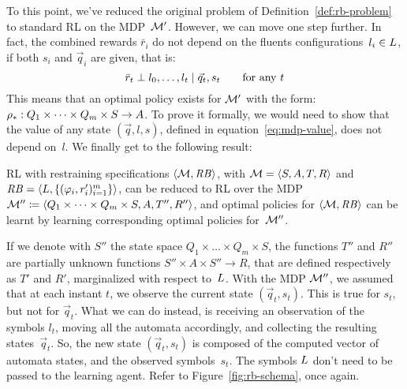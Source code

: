 To this point, we've reduced the original problem of
Definition~\ref{def:rb-problem} to standard RL on the MDP~$\mathcal{M}'$. However,
we can move one step further. In fact, the combined rewards $\bar{r}_i$ do not
depend on the fluents configurations~$l_i \in L$, if both $s_i$
and $\vec{q}_i$ are given, that is:
\[
	\bar{r}_t \perp l_0, \dots, l_t \mid \vec{q}_t, s_t \qquad
	\text{for any $t$}
\]
This means that an optimal policy exists for $\mathcal{M}'$ with the form:
${\rho}_*: Q_1 \times \dots \times Q_m \times S \to A$.
To prove it formally, we would need to show that the value of any state
$(\vec{q}, l, s)$, defined in equation~\eqref{eq:mdp-value}, does not depend
on~$l$. We finally get to the following result:
\begin{theorem}
	\cite{bib:bolt} RL with \ldl{} restraining specifications
	$\langle \mathcal{M}, \text{\textit{RB}} \rangle$, with $\mathcal{M} = \langle S, A, T,
	R \rangle$ and $\text{\textit{RB}} = \langle L, \{(\varphi_i,
	r_i')_{i=1}^m\} \rangle$, can be reduced to RL over the MDP $\mathcal{M}'' \coloneqq
	\langle Q_1 \times \dots \times Q_m \times S, A, T'', R''\rangle$,
	and optimal policies for $\langle \mathcal{M}, \text{\textit{RB}} \rangle$ can be learnt
	by learning corresponding optimal policies for~$\mathcal{M}''$.
	\label{th:bolt-equivalence}
\end{theorem}
If we denote with $S''$ the state space $Q_1 \times \dots \times Q_m \times
S$, the functions $T''$ and $R''$ are partially unknown functions $S'' \times
A \times S'' \to R$, that are defined respectively as $T'$ and $R'$,
marginalized with respect to~$L$. With the MDP $\mathcal{M}''$, we assumed
that at each instant $t$, we observe the current state $(\vec{q}_t, s_t)$.
This is true for $s_t$, but not for $\vec{q}_t$. What we can do instead, is
receiving an observation of the symbols $l_t$, moving all the automata
accordingly, and collecting the resulting states~$\vec{q}_t$. So, the new
state $(\vec{q}_t, s_t)$ is composed of the computed vector of automata
states, and the observed symbols~$s_t$. The symbols $L$ don't need
to be passed to the learning agent. Refer to Figure~\ref{fig:rb-schema}, once
again.

